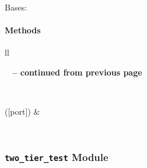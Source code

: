 \documentclass[letterpaper,10pt,english]{sphinxmanual}
\begin{document}
\begin{fulllineitems}
\label{qikify.recipes:qikify.recipes.basic_ML_testing.BasicMLTesting}
Bases: 
\paragraph{Methods}

\begin{longtable}{ll}
\hline
\endfirsthead

%
{{\bfseries \tablename\ \thetable{} -- continued from previous page}} \\
\hline
\endhead

\hline {} \\ \hline
\endfoot

\hline
\endlastfoot


{\hyperref[qikify.recipes:qikify.recipes.basic_ML_testing.BasicMLTesting.run]{}}({[}port{]})
 & 

\\\hline
\end{longtable}


\begin{fulllineitems}
\label{qikify.recipes:qikify.recipes.basic_ML_testing.BasicMLTesting.run}
\end{fulllineitems}


\end{fulllineitems}



\subsubsection{\texttt{two\_tier\_test} Module}
\label{qikify.recipes:module-qikify.recipes.two_tier_test}\label{qikify.recipes:two-tier-test-module}
\end{document}
